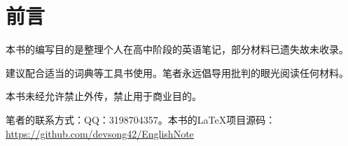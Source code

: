\chapter*{前言}
本书的编写目的是整理个人在高中阶段的英语笔记，部分材料已遗失故未收录。

建议配合适当的词典等工具书使用。笔者永远倡导用批判的眼光阅读任何材料。

本书未经允许禁止外传，禁止用于商业目的。

笔者的联系方式：QQ：3198704357。本书的\LaTeX{}项目源码：\url{https://github.com/devsong42/EnglishNote}
